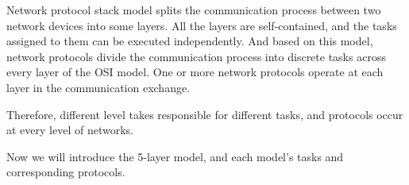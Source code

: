 \documentclass[10pt]{article}
\begin{document}
Network protocol stack model splits the communication process between two network devices into some layers. All the layers are self-contained, and the tasks assigned to them can be executed independently. And based on this model, network protocols divide the communication process into discrete tasks across every layer of the OSI model. One or more network protocols operate at each layer in the communication exchange.

Therefore, different level takes responsible for different tasks, and protocols occur at every level of networks.

Now we will introduce the 5-layer model, and each model's tasks and corresponding protocols.
\end{document}
